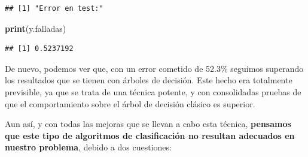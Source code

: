\documentclass[spanish,]{article}
\newenvironment{Shaded}{\begin{snugshade}}{\end{snugshade}}
\newcommand{\KeywordTok}[1]{\textcolor[rgb]{0.13,0.29,0.53}{\textbf{#1}}}
\newcommand{\DataTypeTok}[1]{\textcolor[rgb]{0.13,0.29,0.53}{#1}}
\newcommand{\DecValTok}[1]{\textcolor[rgb]{0.00,0.00,0.81}{#1}}
\newcommand{\StringTok}[1]{\textcolor[rgb]{0.31,0.60,0.02}{#1}}
\newcommand{\CommentTok}[1]{\textcolor[rgb]{0.56,0.35,0.01}{\textit{#1}}}
\newcommand{\OperatorTok}[1]{\textcolor[rgb]{0.81,0.36,0.00}{\textbf{#1}}}
\newcommand{\NormalTok}[1]{#1}
\begin{document}
\begin{Shaded}
\end{Shaded}

\begin{verbatim}
## [1] "Error en test:"
\end{verbatim}

\begin{Shaded}
\begin{Highlighting}[]
\KeywordTok{print}\NormalTok{(y.falladas)}
\end{Highlighting}
\end{Shaded}

\begin{verbatim}
## [1] 0.5237192
\end{verbatim}

De nuevo, podemos ver que, con un error cometido de 52.3\% seguimos
superando los resultados que se tienen con árboles de decisión. Este
hecho era totalmente previsible, ya que se trata de una técnica potente,
y con consolidadas pruebas de que el comportamiento sobre el árbol de
decisión clásico es superior.

Aun así, y con todas las mejoras que se llevan a cabo esta técnica,
\textbf{pensamos que este tipo de algoritmos de clasificación no
resultan adecuados en nuestro problema}, debido a dos cuestiones:
\end{document}
